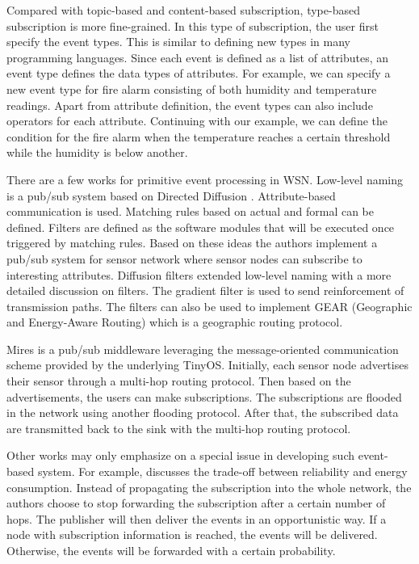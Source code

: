 Compared with topic-based and content-based subscription, type-based subscription is more fine-grained. In this type of subscription, the user first specify the event types. This is similar to defining new types in many programming languages. Since each event is defined as a list of attributes, an event type defines the data types of attributes. For example, we can specify a new event type for fire alarm consisting of both humidity and temperature readings. Apart from attribute definition, the event types can also include operators for each attribute. Continuing with our example, we can define the condition for the fire alarm when the temperature reaches a certain threshold while the humidity is below another. 

There are a few works for primitive event processing in WSN. Low-level naming \cite{lowlevelnaming} is a pub/sub system based on Directed Diffusion \cite{directeddiffusion}. Attribute-based communication is used. Matching rules based on actual and formal can be defined. Filters are defined as the software modules that will be executed once triggered by matching rules. Based on these ideas the authors implement a pub/sub system for sensor network where sensor nodes can subscribe to interesting attributes. Diffusion filters \cite{diffusionfilters} extended low-level naming with a more detailed discussion on filters. The gradient filter is used to send reinforcement of transmission paths. The filters can also be used to implement GEAR (Geographic and Energy-Aware Routing) which is a geographic routing protocol.

Mires \cite{mires} is a pub/sub middleware leveraging the message-oriented communication scheme provided by the underlying TinyOS. Initially, each sensor node advertises their sensor through a multi-hop routing protocol. Then based on the advertisements, the users can make subscriptions. The subscriptions are flooded in the network using another flooding protocol. After that, the subscribed data are transmitted back to the sink with the multi-hop routing protocol.

Other works may only emphasize on a special issue in developing such event-based system. For example, \cite{sp} discusses the trade-off between reliability and energy consumption. Instead of propagating the subscription into the whole network, the authors choose to stop forwarding the subscription after a certain number of hops. The publisher will then deliver the events in an opportunistic way. If a node with subscription information is reached, the events will be delivered. Otherwise, the events will be forwarded with a certain probability.


